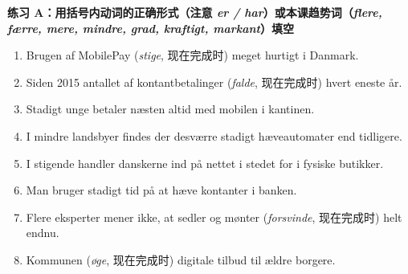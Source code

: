 \textbf{练习 A：用括号内动词的正确形式（注意 \textit{er / har}）或本课趋势词（\textit{flere, færre, mere, mindre, grad, kraftigt, markant}）填空}
\begin{enumerate}
  \item Brugen af MobilePay \underline{\hspace{1.2cm}} \underline{\hspace{1.8cm}} (\textit{stige}, 现在完成时) meget hurtigt i Danmark.
  \item Siden 2015 \underline{\hspace{1.2cm}} antallet af kontantbetalinger \underline{\hspace{1.8cm}} (\textit{falde}, 现在完成时) hvert eneste år.
  \item Stadigt \underline{\hspace{1.6cm}} unge betaler næsten altid med mobilen i kantinen.
  \item I mindre landsbyer findes der desværre stadigt \underline{\hspace{1.6cm}} hæveautomater end tidligere.
  \item I stigende \underline{\hspace{1.4cm}} handler danskerne ind på nettet i stedet for i fysiske butikker.
  \item Man bruger stadigt \underline{\hspace{1.6cm}} tid på at hæve kontanter i banken.
  \item Flere eksperter mener ikke, at sedler og mønter \underline{\hspace{1.2cm}} \underline{\hspace{2.0cm}} (\textit{forsvinde}, 现在完成时) helt endnu.
  \item Kommunen \underline{\hspace{1.2cm}} \underline{\hspace{1.6cm}} (\textit{øge}, 现在完成时) digitale tilbud til ældre borgere.
\end{enumerate}

